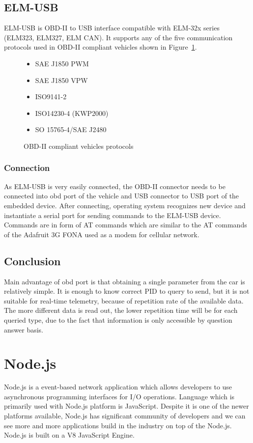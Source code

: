 \subsection{ELM-USB} %
\label{sub:elm_usb}
ELM-USB is OBD-II to USB interface compatible with ELM-32x series (ELM323, ELM327, ELM CAN).\cite{elm_site} It supports any of the five communication protocols used in OBD-II compliant vehicles shown in Figure~\ref{fig:obd_protocol}.
\begin{figure}[htbp]
	\centering
	\begin{itemize}
		\item SAE J1850 PWM
		\item SAE J1850 VPW
		\item ISO9141-2
		\item ISO14230-4 (KWP2000)
		\item SO 15765-4/SAE J2480
	\end{itemize}
	\caption{OBD-II compliant vehicles protocols}
	\label{fig:obd_protocol}
\end{figure}
\subsubsection{Connection} %
\label{ssub:connection}
As ELM-USB is very easily connected, the OBD-II connector needs to be connected into \gls{obd} port of the vehicle and USB connector to USB port of the embedded device. After connecting, operating system recognizes new device and instantiate a serial port for sending commands to the ELM-USB device. Commands are in form of AT commands which are similar to the AT commands of the Adafruit 3G FONA used as a modem for cellular network.
\subsection{Conclusion} %
\label{sub:conlusion}
Main advantage of \gls{obd} port is that obtaining a single parameter from the car is relatively simple. It is enough to know correct PID to query to send, but it is not suitable for real-time telemetry, because of repetition rate of the available data. The more different data is read out, the lower repetition time will be for each queried type, due to the fact that information is only accessible by question answer basis.
\section{Node.js} %
\label{sec:node_js}
Node.js is a event-based network application which allows developers to use asynchronous programming interfaces for I/O operations. Language which is primarily used with Node.js platform is JavaScript. Despite it is one of the newer platforms available, Node.js has significant community of developers and we can see more and more applications build in the industry on top of the Node.js. Node.js is built on a V8 JavaScript Engine.
